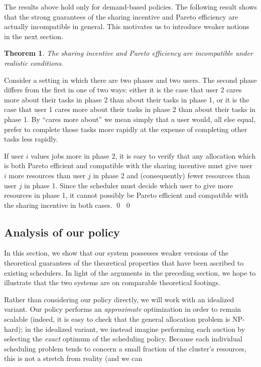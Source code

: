 \documentclass{acm_proc_article-sp}
\newtheorem{theorem}{Theorem}[section]
\newenvironment{pproof}[1][Proof]{\begin{trivlist}
\item[\hskip \labelsep {\bfseries #1}]}{\end{trivlist}}
\begin{document}
The results above hold only for demand-based policies.
The following result shows that the strong guarantees of the sharing
incentive and Pareto efficiency are actually incompatible in general.
This motivates us to introduce weaker notions in the next section.
\vspace{-5mm}
\begin{theorem}\label{no-efficiency}
The sharing incentive and Pareto efficiency are incompatible under realistic conditions.
\end{theorem}
\vspace{-5mm}
\begin{pproof}
Consider a setting in which there are two phases and two users. 
The second phase differs from the first in one of two ways: 
either it is the case that user 2 cares more about their tasks in phase 2 than about their tasks in phase 1, 
or it is the case that user 1 cares more about their tasks in phase 2 than about their tasks in phase 1. 
By ``cares more about'' we mean simply that a user would, all else equal, 
prefer to complete those tasks more rapidly at the expense of completing other tasks less rapidly.

If user $i$ values jobs more in phase 2, it is easy to verify that any allocation which is both Pareto efficient and compatible with the sharing incentive must give user $i$ 
more resources than user $j$ in phase 2 and (consequently) fewer resources than user $j$ in phase 1. 
Since the scheduler must decide which user to give more resources in phase 1, it cannot possibly be Pareto efficient and compatible with the sharing incentive in both cases. \qed
\qed
\end{pproof}

\subsection{Analysis of our policy}
In this section, we show that our system possesses weaker versions of the theoretical guarantees of the theoretical properties that have been ascribed to existing schedulers. In light of the arguments in the preceding section, we hope to illustrate that the two systems are on comparable theoretical footings.

Rather than considering our policy directly, we will work with an idealized variant.
Our policy performs an \emph{approximate} optimization in order to remain scalable (indeed, it is easy to check that the general allocation problem
is NP-hard);
in the idealized variant, we instead imagine performing each auction by selecting the \emph{exact} optimum of the scheduling policy.
Because each individual scheduling problem tends to concern a small fraction of the cluster's resources,
this is not a stretch from reality (and we can 
\end{document}
